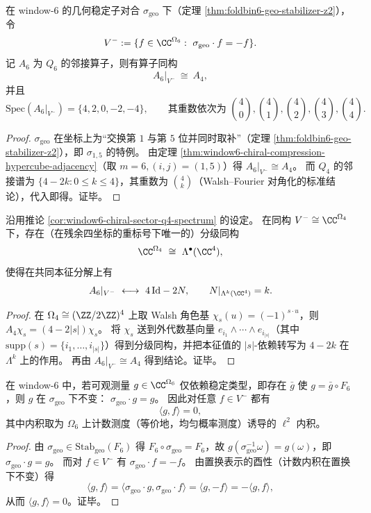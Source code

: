 \begin{corollary}\label{cor:window6-chiral-sector-q4-spectrum}
在 window-\(6\) 的几何稳定子对合 \(\sigma_{\mathrm{geo}}\) 下（定理 \ref{thm:foldbin6-geo-stabilizer-z2}），令
\[
V^-:=\{f\in\CC^{\Omega_6}:\ \sigma_{\mathrm{geo}}\cdot f=-f\}.
\]
记 \(A_6\) 为 \(Q_6\) 的邻接算子，则有算子同构
\[
A_6|_{V^-}\ \cong\ A_4,
\]
并且
\[
\mathrm{Spec}(A_6|_{V^-})=\{4,2,0,-2,-4\},
\qquad
\text{其重数依次为 }\binom40,\binom41,\binom42,\binom43,\binom44.
\]
\end{corollary}
\begin{proof}
\(\sigma_{\mathrm{geo}}\) 在坐标上为“交换第 \(1\) 与第 \(5\) 位并同时取补”（定理 \ref{thm:foldbin6-geo-stabilizer-z2}），即 \(\sigma_{1,5}\) 的特例。
由定理 \ref{thm:window6-chiral-compression-hypercube-adjacency}（取 \(m=6,(i,j)=(1,5)\)）得 \(A_6|_{V^-}\cong A_4\)。
而 \(Q_4\) 的邻接谱为 \(\{4-2k:0\le k\le 4\}\)，其重数为 \(\binom{4}{k}\)（Walsh--Fourier 对角化的标准结论），代入即得。证毕。
\end{proof}

\begin{proposition}\label{prop:window6-chiral-exterior-algebra-degree-operator}
沿用推论 \ref{cor:window6-chiral-sector-q4-spectrum} 的设定。
在同构 \(V^-\cong \CC^{\Omega_4}\) 下，存在（在残余四坐标的重标号下唯一的）分级同构
\[
\CC^{\Omega_4}\ \cong\ \Lambda^\bullet(\CC^4),
\]
使得在共同本征分解上有
\[
A_6|_{V^-}\ \longleftrightarrow\ 4\,\mathrm{Id}-2N,
\qquad
N|_{\Lambda^k(\CC^4)}=k.
\]
\end{proposition}
\begin{proof}
在 \(\Omega_4\cong(\ZZ/2\ZZ)^4\) 上取 Walsh 角色基 \(\chi_s(u)=(-1)^{s\cdot u}\)，则 \(A_4\chi_s=(4-2|s|)\chi_s\)。
将 \(\chi_s\) 送到外代数基向量 \(e_{i_1}\wedge\cdots\wedge e_{i_{|s|}}\)（其中 \(\mathrm{supp}(s)=\{i_1,\dots,i_{|s|}\}\)）得到分级同构，并把本征值的 \(|s|\)-依赖转写为 \(4-2k\) 在 \(\Lambda^k\) 上的作用。
再由 \(A_6|_{V^-}\cong A_4\) 得到结论。证毕。
\end{proof}

\begin{proposition}[手征扇区对稳定类型可观测量的严格正交性]\label{prop:window6-chiral-orthogonality-to-type-observables}
在 window-\(6\) 中，若可观测量 \(g\in\CC^{\Omega_6}\) 仅依赖稳定类型，即存在 \(\bar g\) 使 \(g=\bar g\circ F_6\)，则 \(g\) 在 \(\sigma_{\mathrm{geo}}\) 下不变：
\(
\sigma_{\mathrm{geo}}\cdot g=g
\)。
因此对任意 \(f\in V^-\) 都有
\[
\langle g,f\rangle=0,
\]
其中内积取为 \(\Omega_6\) 上计数测度（等价地，均匀概率测度）诱导的 \(\ell^2\) 内积。
\end{proposition}
\begin{proof}
由 \(\sigma_{\mathrm{geo}}\in \mathrm{Stab}_{\mathrm{geo}}(F_6)\) 得 \(F_6\circ\sigma_{\mathrm{geo}}=F_6\)，故 \(g(\sigma_{\mathrm{geo}}^{-1}\omega)=g(\omega)\)，即 \(\sigma_{\mathrm{geo}}\cdot g=g\)。
而对 \(f\in V^-\) 有 \(\sigma_{\mathrm{geo}}\cdot f=-f\)。
由置换表示的酉性（计数内积在置换下不变）得
\[
\langle g,f\rangle=\langle \sigma_{\mathrm{geo}}\cdot g,\sigma_{\mathrm{geo}}\cdot f\rangle=\langle g,-f\rangle=-\langle g,f\rangle,
\]
从而 \(\langle g,f\rangle=0\)。证毕。
\end{proof}

